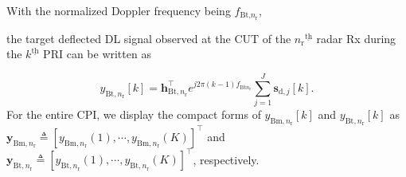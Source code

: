 \documentclass[9pt,journal]{IEEEtran}
\newcommand{\paren}[1]{\left({#1}\right)}
\newcommand{\bracket}[1]{{\left [{#1}\right ]}}
\newcommand{\ith}[1]    {{#1}^{\underline{\text{th}}}}
\newcommand{\rr}{_\mathrm{r}}
\newcommand{\target}{\mathrm{t}}
\begin{document}
With the normalized Doppler frequency being $f_{\textrm{Bt,}n\rr}$, 

the target deflected DL signal observed at the CUT of the $\ith{n\rr}$ radar Rx during the $\ith{k}$ PRI can be written as\par\noindent\small
\begin{equation*}
y_{\mathrm{Bt},n\rr}\bracket{k}=\mathbf{h}_{\mathrm{Bt},n\rr}^\top e^{j2\pi\paren{k-1} f_{\mathrm{Bt}n_\mathrm{r}}}
\sum_{j=1}^\mathit{J}\mathbf{s}_{\textrm{d},j}\bracket{k}.
\end{equation*}\normalsize
For the entire CPI, we display the compact forms of $y_{\mathrm{Bm},n\rr}\bracket{k}$ and $y_{\mathrm{Bt},n\rr}\bracket{k}$ as $\mathbf{y}_{\mathrm{Bm},n\rr}\triangleq\bracket{y_{\mathrm{Bm},n\rr}\paren{1},\cdots,y_{\mathrm{Bm},n\rr}\paren{\mathit{K}}}^\top$ and  $\mathbf{y}_{\mathrm{Bt},n\rr}\triangleq\bracket{y_{\mathrm{Bt},n\rr}\paren{1},\cdots,y_{\mathrm{Bt},n\rr}\paren{\mathit{K}}}^\top$, respectively.  
\end{document}
